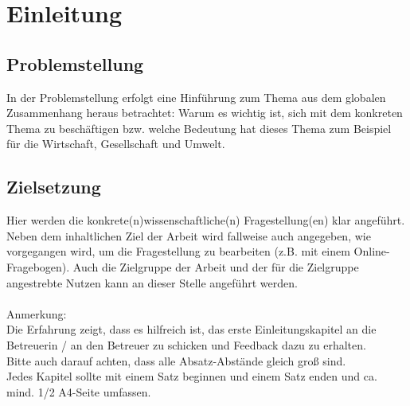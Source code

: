 \chapter{Einleitung\cite{LoremIpsum}}
\blindtext[1]

\section{Problemstellung}
In der Problemstellung erfolgt eine Hinführung zum Thema aus dem globalen Zusammenhang heraus betrachtet: Warum es wichtig ist, sich mit dem konkreten Thema zu beschäftigen bzw. welche Bedeutung hat dieses Thema zum Beispiel für die Wirtschaft, Gesellschaft und Umwelt.

\section{Zielsetzung}
Hier werden die konkrete(n)wissenschaftliche(n) Fragestellung(en) klar angeführt. Neben dem inhaltlichen Ziel der Arbeit wird fallweise auch angegeben, wie vorgegangen wird, um die Fragestellung zu bearbeiten (z.B. mit einem Online-Fragebogen). Auch die Zielgruppe der Arbeit und der für die Zielgruppe angestrebte Nutzen kann an dieser Stelle angeführt werden.
\\
\\
Anmerkung: 
\\Die Erfahrung zeigt, dass es hilfreich ist, das erste Einleitungskapitel an die Betreuerin / an den Betreuer zu schicken und Feedback dazu zu erhalten.
\\Bitte auch darauf achten, dass alle Absatz-Abstände gleich groß sind.
\\Jedes Kapitel sollte mit einem Satz beginnen und einem Satz enden und ca. mind. 1/2 A4-Seite umfassen. 
